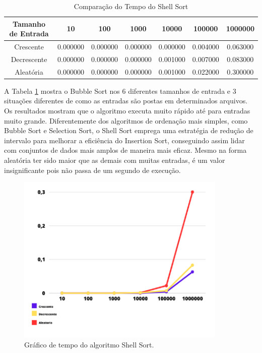 \begin{table}[h]
    \centering
    \caption{Comparação do Tempo do Shell Sort}
    \begin{tabular}{|c|c|c|c|c|c|c|}
        \hline
        Tamanho de Entrada & 10 & 100 & 1000 & 10000 & 100000 & 1000000 \\
        \hline
        Crescente & 0.000000 & 0.000000 & 0.000000 & 0.000000 & 0.004000 & 0.063000 \\
        \hline
        Decrescente & 0.000000 & 0.000000 & 0.000000 & 0.001000 & 0.007000 & 0.083000 \\
        \hline
        Aleatória & 0.000000 & 0.000000 & 0.000000 & 0.001000 & 0.022000 & 0.300000 \\
        \hline
    \end{tabular}
    \label{tab:comparacaoshell}
\end{table}

A Tabela \ref{tab:comparacaoshell} mostra o Bubble Sort nos 6 diferentes tamanhos
de entrada e 3 situações diferentes de como as entradas são postas em determinados arquivos. Os resultados mostram que o algoritmo executa muito rápido até para entradas muito grande. Diferentemente dos algoritmos de ordenação mais simples, como Bubble Sort e Selection Sort, o Shell Sort emprega uma estratégia de redução de intervalo para melhorar a eficiência do Insertion Sort, conseguindo assim lidar com conjuntos de dados mais amplos de maneira mais eficaz. Mesmo na forma aleatória ter sido maior que as demais com muitas entradas, é um valor insignificante pois não passa de um segundo de execução.

\begin{figure}[h!]
    \centering
    \includegraphics[width = 10cm]{Imagens/Shell Sort/Captura de tela 2023-09-27 211633.png}
    \caption{Gráfico de tempo do algoritmo Shell Sort.}
    \label{fig:shell1}
\end{figure}